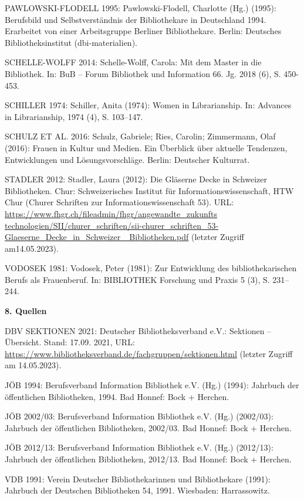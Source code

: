 \documentclass[a4paper,
fontsize=11pt,
oneside,
numbers=noperiodatend,
parskip=half-,
bibliography=totoc,
final
]{scrartcl}
\begin{document}
PAWLOWSKI-FLODELL 1995: Pawlowski-Flodell, Charlotte (Hg.) (1995):
Berufsbild und Selbstverständnis der Bibliothekare in Deutschland 1994.
Erarbeitet von einer Arbeitsgruppe Berliner Bibliothekare. Berlin:
Deutsches Bibliotheksinstitut (dbi-materialien).

SCHELLE-WOLFF 2014: Schelle-Wolff, Carola: Mit dem Master in die
Bibliothek. In: BuB -- Forum Bibliothek und Information 66. Jg. 2018
(6), S. 450-453.

SCHILLER 1974: Schiller, Anita (1974): Women in Librarianship. In:
Advances in Librarianship, 1974 (4), S. 103--147.

SCHULZ ET AL. 2016: Schulz, Gabriele; Ries, Carolin; Zimmermann, Olaf
(2016): Frauen in Kultur und Medien. Ein Überblick über aktuelle
Tendenzen, Entwicklungen und Lösungsvorschläge. Berlin: Deutscher
Kulturrat.

STADLER 2012: Stadler, Laura (2012): Die Gläserne Decke in Schweizer
Bibliotheken. Chur: Schweizerisches Institut für
Informationswissenschaft, HTW Chur (Churer Schriften zur
Informationswissenschaft 53). URL:
\href{https://www.fhgr.ch/fileadmin/fhgr/angewandte_zukunftstechnologien/SII/churer_schriften/sii-churer_schriften_53-Glaeserne_Decke_in_Schweizer_Bibliotheken.pdf}{https://www.fhgr.ch/fileadmin/fhgr/angewandte\_zukunfts \break technologien/SII/churer\_schriften/sii-churer\_schriften\_53-Glaeserne\_Decke\_in\_Schweizer\_ Bibliotheken.pdf}
(letzter Zugriff am14.05.2023).

VODOSEK 1981: Vodosek, Peter (1981): Zur Entwicklung des
bibliothekarischen Berufs als Frauenberuf. In: BIBLIOTHEK Forschung und
Praxis 5 (3), S. 231--244.

\textbf{8. Quellen}

DBV SEKTIONEN 2021: Deutscher Bibliotheksverband e.V.: Sektionen --
Übersicht. Stand: 17.09. 2021, URL: \url{https://www.bibliotheksverband.de/fachgruppen/sektionen.html}
(letzter Zugriff am 14.05.2023).

JÖB 1994: Berufsverband Information Bibliothek e.V. (Hg.) (1994):
Jahrbuch der öffentlichen Bibliotheken, 1994. Bad Honnef: Bock +
Herchen.

JÖB 2002/03: Berufsverband Information Bibliothek e.V. (Hg.) (2002/03):
Jahrbuch der öffentlichen Bibliotheken, 2002/03. Bad Honnef: Bock +
Herchen.

JÖB 2012/13: Berufsverband Information Bibliothek e.V. (Hg.) (2012/13):
Jahrbuch der öffentlichen Bibliotheken, 2012/13. Bad Honnef: Bock +
Herchen.

VDB 1991: Verein Deutscher Bibliothekarinnen und Bibliothekare (1991):
Jahrbuch der Deutschen Bibliotheken 54, 1991. Wiesbaden: Harrassowitz.
\end{document}
